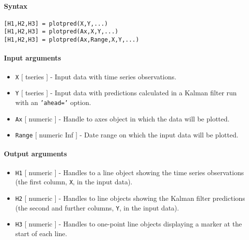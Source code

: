 


	\paragraph{Syntax}\label{syntax}

\begin{verbatim}
[H1,H2,H3] = plotpred(X,Y,...)
[H1,H2,H3] = plotpred(Ax,X,Y,...)
[H1,H2,H3] = plotpred(Ax,Range,X,Y,...)
\end{verbatim}

\paragraph{Input arguments}\label{input-arguments}

\begin{itemize}
\item
  \texttt{X} {[} tseries {]} - Input data with time series observations.
\item
  \texttt{Y} {[} tseries {]} - Input data with predictions calculated in
  a Kalman filter run with an \texttt{'ahead='} option.
\item
  \texttt{Ax} {[} numeric {]} - Handle to axes object in which the data
  will be plotted.
\item
  \texttt{Range} {[} numeric \textbar{} Inf {]} - Date range on which
  the input data will be plotted.
\end{itemize}

\paragraph{Output arguments}\label{output-arguments}

\begin{itemize}
\item
  \texttt{H1} {[} numeric {]} - Handles to a line object showing the
  time series observations (the first column, \texttt{X}, in the input
  data).
\item
  \texttt{H2} {[} numeric {]} - Handles to line objects showing the
  Kalman filter predictions (the second and further columns, \texttt{Y},
  in the input data).
\item
  \texttt{H3} {[} numeric {]} - Handles to one-point line objects
  displaying a marker at the start of each line.
\end{itemize}

